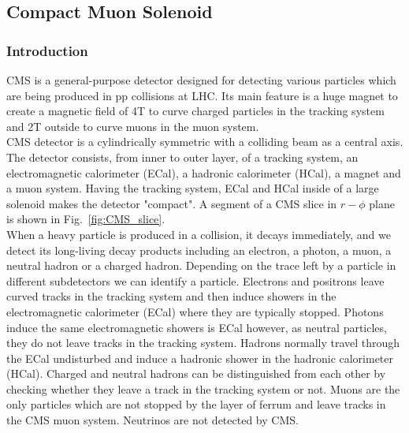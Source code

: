 \subsection{Compact Muon Solenoid}
\label{sec:Exp_CMS}
\subsubsection{Introduction}

CMS is a general-purpose detector designed for detecting various particles which are being produced in pp collisions at LHC. Its main feature is a huge magnet to create a magnetic field of 4T to curve charged particles in the tracking system and 2T outside to curve muons in the muon system.\\

CMS detector is a cylindrically symmetric with a colliding beam as a central axis. The detector consists, from inner to outer layer,  of a tracking system, an electromagnetic calorimeter (ECal), a hadronic calorimeter (HCal), a magnet and a muon system. Having the tracking system, ECal and HCal inside of a large solenoid makes the detector "compact". A segment of a CMS slice in $r-\phi$ plane is shown in Fig.~\ref{fig:CMS_slice}.\\

When a heavy particle is produced in a collision, it decays immediately, and we detect its long-living decay products including an electron, a photon, a muon, a neutral hadron or a charged hadron. Depending on the trace left by a particle in different subdetectors we can identify a particle. Electrons and positrons leave curved tracks in the tracking system and then induce showers in the electromagnetic calorimeter (ECal) where they are typically stopped. Photons induce the same electromagnetic showers is ECal however, as neutral particles, they do not leave tracks in the tracking system. Hadrons normally travel through the ECal undisturbed and induce a hadronic shower in the hadronic calorimeter (HCal). Charged and neutral hadrons can be distinguished from each other by checking whether they leave a track in the tracking system or not. Muons are the only particles which are not stopped by the layer of ferrum and leave tracks in the CMS muon system. Neutrinos are not detected by CMS. \\  

